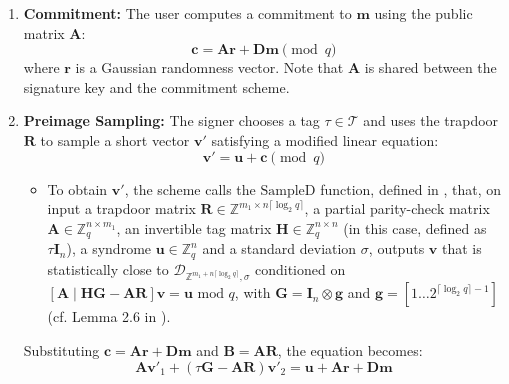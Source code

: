 \documentclass[a4paper]{article}
\begin{document}
\begin{enumerate}
    \item \textbf{Commitment:} The user computes a commitment to $\mathbf{m}$ using the public matrix $\mathbf{A}$:
          \begin{equation}
              \mathbf{c} = \mathbf{A}\mathbf{r} + \mathbf{D}\mathbf{m} \pmod q
          \end{equation}
          where $\mathbf{r}$ is a Gaussian randomness vector. Note that $\mathbf{A}$ is shared between the signature key and
          the commitment scheme.

    \item \textbf{Preimage Sampling:} The signer chooses a tag $\tau \in \mathcal{T}$ and uses the trapdoor $\mathbf{R}$ to sample a
          short vector $\mathbf{v}'$ satisfying a modified linear equation:
          \begin{equation}
              [\mathbf{A} \mid \tau\mathbf{G} - \mathbf{B}] \mathbf{v}' = \mathbf{u} + \mathbf{c} \pmod q
          \end{equation}
          \begin{itemize}
            \item To obtain $\mathbf{v}'$, the scheme calls the $\text{SampleD}$ function, defined in \cite{MP12}, that, on input a trapdoor matrix $\mathbf{R} \in \mathbb{Z}^{m_1 \times n \lceil \log_2 q\rceil}$, 
                a partial parity-check matrix $\mathbf{A} \in \mathbb{Z}_q^{n \times m_1}$, an invertible tag matrix
                $\mathbf{H} \in \mathbb{Z}_q^{n \times n}$ (in this case, defined as $\tau \mathbf{I}_n$), a syndrome $\mathbf{u} \in \mathbb{Z}_q^n$ and a standard deviation $\sigma$, outputs $\mathbf{v}$ that is statistically close to $\mathcal{D}_{\mathbb{Z}^{m_1 + n \lceil \log_2 q\rceil}, \sigma}$
                conditioned on $[\mathbf{A} \mid \mathbf{HG} - \mathbf{AR}]\mathbf{v} = \mathbf{u} \text{ mod }q$, with $\mathbf{G} = \mathbf{I}_n \otimes \mathbf{g}$ and $\mathbf{g} = [1\dots 2^{\lceil \log_2 q\rceil - 1}]$ (cf. Lemma 2.6 in \cite{mainPaper}).
          \end{itemize}
          Substituting $\mathbf{c} = \mathbf{A}\mathbf{r} + \mathbf{D}\mathbf{m}$ and $\mathbf{B} = \mathbf{A}\mathbf{R}$,
          the equation becomes:
          \begin{equation}
              \mathbf{A}\mathbf{v}'_1 + (\tau\mathbf{G} - \mathbf{A}\mathbf{R})\mathbf{v}'_2 = \mathbf{u} + \mathbf{A}\mathbf{r} + \mathbf{D}\mathbf{m}
          \end{equation}


\end{enumerate}
\end{document}
